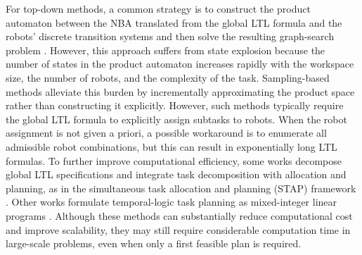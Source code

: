 \documentclass[lettersize,journal]{IEEEtran}
\theoremstyle{italiclemma}
\theoremstyle{italiclemma}
\theoremstyle{definition}
\begin{document}
For top-down methods, a common strategy is to construct the product automaton between the NBA translated from the global LTL formula and the robots' discrete transition systems and then solve the resulting graph-search problem \cite{smith2010optimal,Kloetzer2015LTL,9196928,DING2014399}.  However, this approach suffers from state explosion because the number of states in the product automaton increases rapidly with the workspace size, the number of robots, and the complexity of the task. Sampling-based methods \cite{kantaros2020stylus,kantaros2018sampling,9385707} alleviate this burden by incrementally approximating the product space rather than constructing it explicitly. However, such methods typically require the global LTL formula to explicitly assign subtasks to robots. When the robot assignment is not given a priori, a possible workaround is to enumerate all admissible robot combinations, but this can result in exponentially long LTL formulas. 
To further improve computational efficiency, some works decompose global LTL specifications and integrate task decomposition with allocation and planning, as in the simultaneous task allocation and planning (STAP) framework \cite{schillinger2017multi,schillinger2018simultaneous}. Other works formulate temporal-logic task planning as mixed-integer linear programs \cite{karaman2008vehicle,9663414, Raman2015MILP}. Although these methods can substantially reduce computational cost and improve scalability, they may still require considerable computation time in large-scale problems, even when only a first feasible plan is required.
\end{document}

